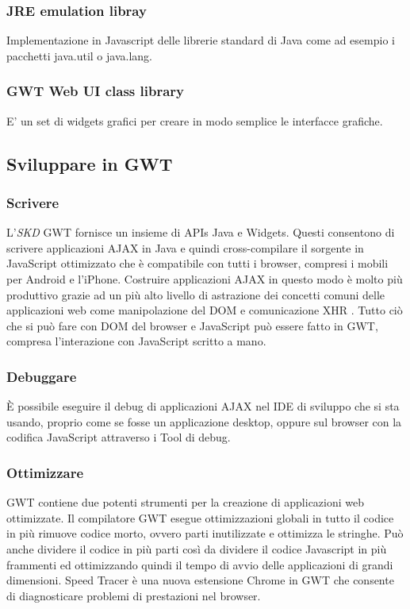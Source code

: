 		\subsubsection{JRE emulation libray}
		Implementazione in Javascript delle librerie standard di Java come ad esempio
		i pacchetti java.util o java.lang.
		\subsubsection{GWT Web UI class library}
		E' un set di widgets grafici per creare in modo semplice le interfacce grafiche. 
	  
	  \newpage
	  \subsection{Sviluppare in GWT}
		\subsubsection{Scrivere}
		L'\textit{SKD} \gls{GWT} fornisce un insieme di \gls{API}s Java e Widgets.
		Questi consentono di scrivere applicazioni AJAX in Java e quindi cross-compilare il sorgente in JavaScript 
		ottimizzato che è compatibile con tutti i browser, compresi i mobili per Android e l'iPhone.
		Costruire applicazioni AJAX in questo modo è molto più produttivo grazie ad un più alto livello di astrazione 
		dei concetti comuni delle applicazioni web come manipolazione del \gls{DOM} e comunicazione \gls{XHR} \cite{XHR}.
		Tutto ciò che si può fare con \gls{DOM} del browser e JavaScript può essere fatto in GWT,
		compresa l'interazione con JavaScript scritto a mano.
		\subsubsection{Debuggare}
		È possibile eseguire il debug di applicazioni \gls{AJAX} nel \gls{IDE} di sviluppo che si sta usando, 
		proprio come se fosse un applicazione desktop, oppure sul browser con la codifica JavaScript attraverso i Tool
		di debug.
		\subsubsection{Ottimizzare}
		\gls{GWT} contiene due potenti strumenti per la creazione di applicazioni web ottimizzate.
		Il compilatore GWT esegue ottimizzazioni globali in tutto il codice in più rimuove codice morto, ovvero
		parti inutilizzate e ottimizza le stringhe. Può anche dividere il codice in più parti così da dividere
		il codice Javascript in più frammenti ed ottimizzando quindi il tempo di avvio delle applicazioni di grandi
		dimensioni.
		Speed Tracer è una nuova estensione Chrome in 
		GWT che consente di diagnosticare problemi di prestazioni nel browser.
